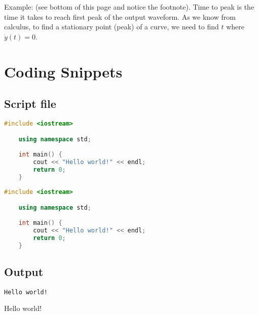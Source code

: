 Example: (see bottom of this page and notice the footnote). Time to peak is the time it takes to reach first peak of the output waveform\footnotemark. As we know from calculus, to find a stationary point (peak) of a curve, we need to find $t$ where $\dot{y}(t)=0$. \bigskip


\section{Coding Snippets}

\subsection{Script file}

\begin{TeXlstlisting}
\lstset{style=code_file}

\begin{lstlisting}[language=C++]
    #include <iostream>

    using namespace std;
    
    int main() {
        cout << "Hello world!" << endl;    
        return 0;
    }

\end{lstlisting}
\end{TeXlstlisting}

\lstset{style=code_file}

\begin{lstlisting}[language=C++]
    #include <iostream>

    using namespace std;
    
    int main() {
        cout << "Hello world!" << endl;    
        return 0;
    }

\end{lstlisting}

\subsection{Output}
\lstset{style=output}

\begin{TeXlstlisting}
\lstset{style=output}

\begin{lstlisting}
Hello world!
\end{lstlisting}

\end{TeXlstlisting}

\lstset{style=output}

\begin{TeXlstlisting}
Hello world!
\end{TeXlstlisting}